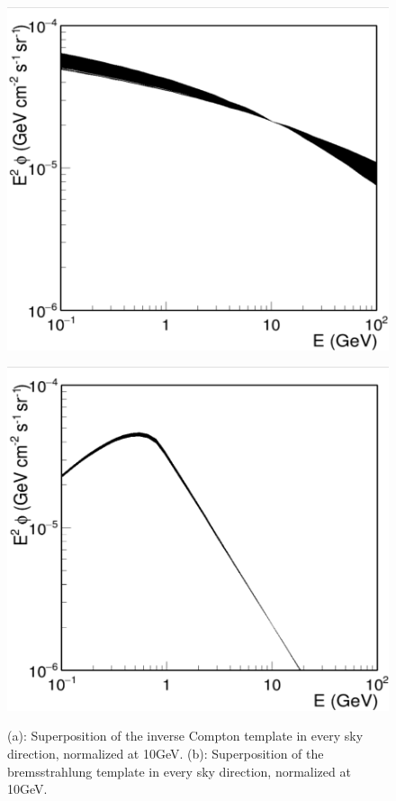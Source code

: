 \begin{figure}[h]
  \centering
  \begin{minipage}[h]{0.45\textwidth}
  	\centering
	\includegraphics[trim={0 0cm 0 0.2cm}, clip, width=1.\linewidth]{pic/method/IC_variations.png}
 	\subcaption{}
 	\label{fig:IC_variations}
  \end{minipage}
  \hfill
  \begin{minipage}[h]{0.45\textwidth}
	  \centering
	  \includegraphics[trim={0 0cm 0 0.2cm}, clip, width=1.\linewidth]{pic/method/BR_variations.png}
	  \subcaption{}
	  \label{fig:BR_variations}
  \end{minipage}
  \caption{(a): Superposition of the inverse Compton template in every sky direction, normalized at 10GeV. (b): Superposition of the bremsstrahlung template in every sky direction, normalized at 10GeV.}
  \label{fig:IC_BR_variations} 
\end{figure}


